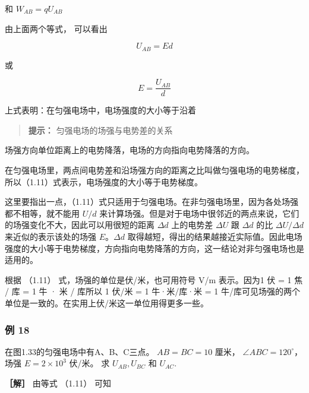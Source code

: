 和 \(W_{AB} = qU_{AB}\)

由上面两个等式， 可以看出

\[
U_{A B} = E d
\]

或

\[
E = \frac{U_{A B}}{d} \tag{1.11}
\]

上式表明：在匀强电场中，电场强度的大小等于沿着

\begin{quote}
\textbf{提示：} 匀强电场的场强与电势差的关系
\end{quote}

场强方向单位距离上的电势降落，电场的方向指向电势降落的方向。

在匀强电场里，两点间电势差和沿场强方向的距离之比叫做匀强电场的电势梯度，所以（1.11）式表示，电场强度的大小等于电势梯度。

这里要指出一点，（1.11）式只适用于匀强电场。在非匀强电场里，因为各处场强都不相等，就不能用
\(U / d\)
来计算场强。但是对于电场中很邻近的两点来说，它们的场强变化不大，因此可以用很短的距离
\(\Delta d\) 上的电势差 \(\Delta U\) 跟 \(\Delta d\) 的比
\(\Delta U / \Delta d\) 来近似的表示该处的场强 \(E\)。\(\Delta d\)
取得越短，得出的结果越接近实际值。因此电场强度的大小等于电势梯度，方向指向电势降落的方向，这一结论对非匀强电场也是适用的。

根据 （1.11） 式，场强的单位是伏/米，也可用符号 V/m 表示。因为1 伏 = 1
焦 / 库 = 1 牛 · 米 / 库所以 1 伏/米 = 1 牛·米/库·米 = 1
牛/库可见场强的两个单位是一致的。在实用上伏/米这一单位用得更多一些。

\subsubsection{例 18}\label{ux4f8b-18}

在图1.33的匀强电场中有A、B、C三点。 \(AB = BC = 10\) 厘米，
\(\angle ABC = 120^{\circ}\)， 场强 \(E = 2 \times 10^{3}\) 伏/米。 求
\(U_{AB}, U_{BC}\) 和 \(U_{AC}\).

\textbf{［解］} 由等式 （1.11） 可知

